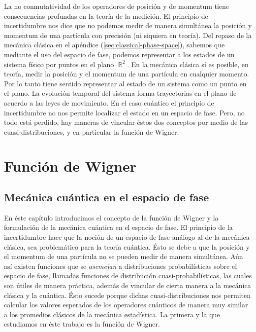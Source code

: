 \documentclass[a4paper]{report}
\DeclareMathOperator{\R}{\mathbb{R}}
\begin{document}
  La no conmutatividad de los operadores de posición y de
  momentum tiene consecuencias profundas en la teoría de la
  medición.  El principio de incertidumbre nos dice que no
  podemos medir de manera simultánea la posición y momentum
  de una partícula con precisión (ni siquiera en teoría).
  Del repaso de la mecánica clásica en el apéndice
  (\ref{sec:classical-phase-space}), sabemos
  que mediante el uso del espacio de fase, podemos
  representar a los estados de un sistema físico por puntos
  en el plano $\R^2$. En la mecánica clásica sí es posible,
  en teoría, medir la posición y el momentum de una
  partícula en cualquier momento. Por lo tanto tiene sentido
  representar al estado de un sistema como un punto en el
  plano. La evolución temporal del sistema forma
  trayectorias en el plano de acuerdo a las leyes de
  movimiento. En el caso cuántico el principio de
  incertidumbre no nos permite localizar el estado en un
  espacio de fase. Pero, no todo está perdido, hay maneras
  de vincular éstos dos conceptos por medio de las
  cuasi-distribuciones, y en particular la función de
  Wigner.

  \chapter{Función de Wigner}

  \section{Mecánica cuántica en el espacio de fase}

  En éste capítulo introducimos el concepto de la función de
  Wigner y la formulación de la mecánica cuántica en el
  espacio de fase. El principio de la incertidumbre hace que
  la noción de un espacio de fase análogo al de la
  mecánica clásica, sea problemático para la teoría
  cuántica. Ésto se debe a que la posición y el momentum de
  una partícula no se pueden medir de manera simultánea.
  Aún así existen funciones que se \textit{asemejan} a
  distribuciones probabilísticas sobre el espacio de fase,
  llamadas funciones de distribución cuasi-probabilísticas,
  las cuales son útiles de manera práctica, además de
  vincular de cierta manera a la mecánica clásica y la
  cuántica. Ésto sucede porque dichas cuasi-distribuciones
  nos permiten calcular los valores esperados de los
  operadores cuánticos de manera muy similar a los promedios
  clásicos de la mecánica estadística. La primera y la que
  estudiamos en éste trabajo es la función de Wigner.
\end{document}
